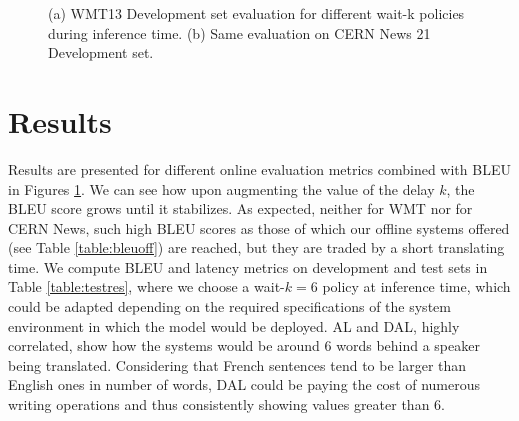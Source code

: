 \documentclass[11pt,english,listoffigures,listoftables]{tfgetsinf}
\begin{document}
\begin{figure}%
    \centering
    \qquad
    \caption{(a) WMT13 Development set evaluation for different wait-k policies during inference time. (b) Same evaluation on CERN News 21 Development set. }%
    \label{chap6:onlineres}%
\end{figure}
\section{Results}
Results are presented for different online evaluation metrics combined with BLEU in Figures \ref{chap6:onlineres}.
We can see how upon augmenting the value of the delay $k$, the BLEU score grows until it stabilizes.
As expected, neither for WMT nor for CERN News, such high BLEU scores as those of which our offline systems offered (see Table \ref{table:bleuoff}) are reached, but they are traded by a short translating time. We compute BLEU and latency metrics on development and test sets in Table \ref{table:testres}, where we choose a wait-$k=6$ policy at inference time, which could be adapted depending on the required specifications of the system environment in which the model would be deployed. AL and DAL, highly correlated, show how the systems would be around 6 words behind a speaker being translated. Considering that French sentences tend to be larger than English ones in number of words, DAL could be paying the cost of numerous writing operations and thus consistently showing values greater than 6.
\end{document}
